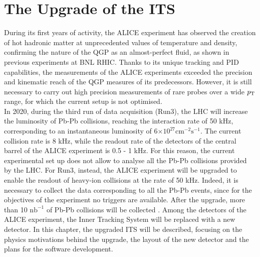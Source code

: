\chapter{The Upgrade of the ITS}
During its first years of activity, the ALICE experiment has observed the creation of hot hadronic matter at unprecedented values of temperature and density, confirming the nature of the QGP as an almost-perfect fluid, as shown in previous experiments at BNL RHIC. Thanks to its unique tracking and PID capabilities, the measurements of the ALICE experiments exceeded the precision and kinematic reach of the QGP measures of its predecessors. However, it is still necessary to carry out high precision measurements of rare probes over a wide $p_\text{T}$ range, for which the current setup is not optimised.\\
In 2020, during the third run of data acquisition (Run3), the LHC will increase the luminosity of Pb-Pb collisions, reaching the interaction rate of 50 kHz, corresponding to an instantaneous luminosity of 6$\mathrm{\times 10^{27} cm^{-2}s^{-1}}$. The current collision rate is 8 kHz, while the readout rate of the detectors of the central barrel of the ALICE experiment is  0.5 - 1 kHz. For this reason, the current experimental set up does not allow to analyse all the Pb-Pb collisions provided by the LHC. For Run3, instead, the ALICE experiment will be upgraded to enable the readout of heavy-ion collisions at the rate of 50 kHz. Indeed, it is necessary to collect the data corresponding to all the Pb-Pb events, since for the objectives of the experiment no triggers are available. After the upgrade, more than 10 $\mathrm{nb^{-1}}$ of Pb-Pb collisions will be collected \cite{uptdr}. Among the detectors of the ALICE experiment, the Inner Tracking System will be replaced with a new detector. In this chapter, the upgraded ITS will be described, focusing on the physics motivations behind the upgrade, the layout of the new detector and the plans for the software development.
